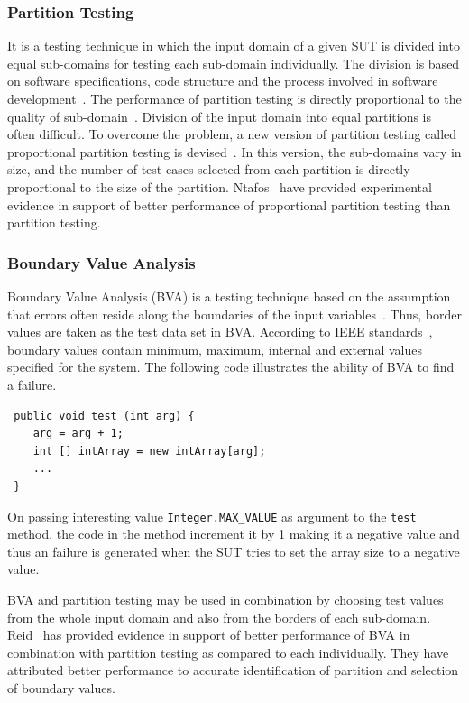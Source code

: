 \subsubsection{Partition Testing}
It is a testing technique in which the input domain of a given SUT is divided into equal sub-domains for testing each sub-domain individually. The division is based on software specifications, code structure and the process involved in software development~\cite{hamlet1990partition}. The performance of partition testing is directly proportional to the quality of sub-domain~\cite{weyuker1991analyzing}. Division of the input domain into equal partitions is often difficult. To overcome the problem, a new version of partition testing called proportional partition testing is devised~\cite{chan1996proportional}. In this version, the sub-domains vary in size, and the number of test cases selected from each partition is directly proportional to the size of the partition. Ntafos~\cite{ntafos1998random} have provided experimental evidence in support of better performance of proportional partition testing than partition testing.


\subsubsection{Boundary Value Analysis}
Boundary Value Analysis (BVA) is a testing technique based on the assumption that errors often reside along the boundaries of the input variables~\cite{ramachandran2003testing}. Thus, border values are taken as the test data set in BVA. According to IEEE standards~\cite{radatz1990ieee}, boundary values contain minimum, maximum, internal and external values specified for the system.
The following code illustrates the ability of BVA to find a failure. 
\bigskip
\begin{lstlisting}
 public void test (int arg) {
	arg = arg + 1;
	int [] intArray = new intArray[arg];
	...
 }
\end{lstlisting}
\bigskip
On passing interesting value \verb+Integer.MAX_VALUE+ as argument to the \verb+test+ method, the code in the method increment it by 1 making it a negative value and thus an failure is generated when the SUT tries to set the array size to a negative value.

BVA and partition testing may be used in combination by choosing test values from the whole input domain and also from the borders of each sub-domain. Reid~\cite{reid1997empirical} has provided evidence in support of better performance of BVA in combination with partition testing as compared to each individually. They have attributed better performance to accurate identification of partition and selection of boundary values. 


